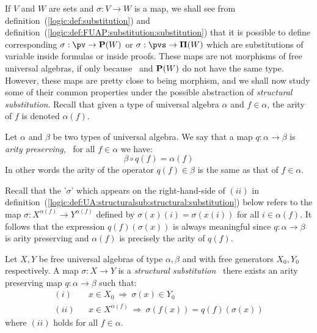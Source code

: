 If $V$ and $W$ are sets and $\sigma:V\to W$ is a map, we shall see
from definition~(\ref{logic:def:substitution}) and
definition~(\ref{logic:def:FUAP:substitution:substitution}) that it
is possible to define corresponding $\sigma:\pv\to{\bf P}(W)$ or
$\sigma:\pvs\to{\bf \Pi}(W)$ which are substitutions of variable
inside formulas or inside proofs. These maps are not morphisms of
free universal algebras, if only because \pv\ and ${\bf P}(W)$ do
not have the same type. However, these maps are pretty close to
being morphism, and we shall now study some of their common
properties under the possible abstraction of {\em structural
substitution}. Recall that given a type of universal algebra
$\alpha$ and $f\in\alpha$, the arity of $f$ is denoted $\alpha(f)$.

\begin{defin}\label{logic:def:UA:structuralsub:arity:preserving}
Let $\alpha$ and $\beta$ be two types of universal algebra. We say
that a map $q:\alpha\to\beta$ is {\em arity preserving}, \ifand\ for
all $f\in\alpha$ we have:
    \[
    \beta\circ q(f)=\alpha(f)
    \]
In other words the arity of the operator $q(f)\in\beta$ is the same
as that of $f\in\alpha$.
\end{defin}

Recall that the '$\sigma$' which appears on the right-hand-side of
$(ii)$ in
definition~(\ref{logic:def:UA:structuralsub:structural:substitution})
below refers to the map $\sigma:X^{\alpha(f)}\to Y^{\alpha(f)}$
defined by $\sigma(x)(i)=\sigma(x(i))$ for all $i\in\alpha(f)$. It
follows that the expression $q(f)(\sigma(x))$ is always meaningful
since $q:\alpha\to\beta$ is arity preserving and $\alpha(f)$ is
precisely the arity of $q(f)$. 
\begin{defin}\label{logic:def:UA:structuralsub:structural:substitution}
Let $X,Y$ be free universal algebras of type $\alpha,\beta$ and with
free generators $X_{0},Y_{0}$ respectively. A map $\sigma:X\to Y$ is
a {\em structural substitution} \ifand\ there exists an arity
preserving map $q:\alpha\to\beta$ such that:
    \begin{eqnarray*}
    (i)&&x\in X_{0}\ \Rightarrow\ \sigma(x)\in Y_{0}\\
    (ii)&&x\in X^{\alpha(f)}\ \Rightarrow\
    \sigma(f(x))= q(f)(\sigma(x))
    \end{eqnarray*}
where $(ii)$ holds for all $f\in\alpha$.
\end{defin}

